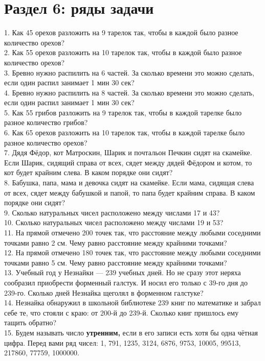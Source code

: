 \documentclass[12pt]{article}
\begin{document}
\section{Раздел 6: ряды задачи}
1. Как 45 орехов разложить на 9 тарелок так, чтобы в каждой было разное количество орехов?\\
2. Как 55 орехов разложить на 10 тарелок так, чтобы в каждой было разное количество орехов?\\
3. Бревно нужно распилить на 6 частей. За сколько времени это можно сделать, если один распил занимает 1 мин 30 сек?\\
4. Бревно нужно распилить на 8 частей. За сколько времени это можно сделать, если один распил занимает 1 мин 30 сек?\\
5. Как 55 грибов разложить на 9 тарелок так, чтобы в каждой тарелке было разное количество грибов?\\
6. Как 65 орехов разложить на 10 тарелок так, чтобы в каждой тарелке было разное количество орехов?\\
7. Дядя Фёдор, кот Матроскин, Шарик и почтальон Печкин сидят на скамейке. Если Шарик, сидящий справа от всех, сядет между дядей Фёдором и котом, то кот будет крайним слева. В каком порядке они сидят?\\
8. Бабушка, папа, мама и девочка сидят на скамейке. Если мама, сидящая слева от всех, сядет между бабушкой и папой, то папа будет крайним справа. В каком порядке они сидят?\\
9. Сколько натуральных чисел расположено между числами 17 и 43?\\
10. Сколько натуральных чисел расположено между числами 19 и 53?\\
11. На прямой отмечено 200 точек так, что расстояние между любыми соседними точками равно 2 см. Чему равно расстояние между крайними точками?\\
12. На прямой отмечено 180 точек так, что расстояние между любыми соседними точками равно 5 см. Чему равно расстояние между крайними точками?\\
13. Учебный год у Незнайки --- 239 учебных дней. Но не сразу этот неряха сообразил приобрести форменный галстук. И носил его только с 39-го дня до 239-го. Сколько дней Незнайка щеголял в форменном галстуке?\\
14. Незнайка обнаружил в школьной библиотеке 239 книг по математике и забрал себе те, что стояли с краю: от 200-й до 239-й. Сколько книг пришлось ему тащить обратно?\\
15. Будем называть число {\bf утренним,} если в его записи есть хотя бы одна чётная цифра. Перед вами ряд чисел: 1, 791, 1235, 3124, 6876, 9753, 10005, 99513, 217860, 77759, 1000000.\\
\end{document}
